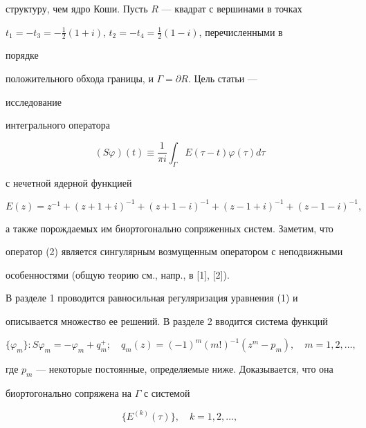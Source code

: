 структуру, чем ядро Коши. Пусть $R$ --- квадрат с вершинами в точках 


$t_1=-t_3=-\frac{1}{2}(1+i)$, $t_2=-t_4=\frac{1}{2}(1-i)$, перечисленными в 


порядке 


положительного обхода границы, и $\Gamma=\partial R$. Цель статьи --- 


исследование 


интегрального оператора 


\begin{equation} 


(S\varphi)(t)\equiv\frac{1}{\pi i}\int_\Gamma 


E(\tau-t)\varphi(\tau)d\tau 


\end{equation} 


с нечетной ядерной функцией 


\begin{equation} 


E(z)=z^{-1}+(z+1+i)^{-1}+(z+1-i)^{-1}+(z-1+i)^{-1}+ 


(z-1-i)^{-1}, 


\end{equation} 


а также порождаемых им биортогонально сопряженных систем. Заметим, что 


оператор (2) является сингулярным возмущенным оператором с неподвижными 


особенностями (общую теорию см., напр., в [1], [2]). 


 


В разделе 1 проводится равносильная регуляризация уравнения (1) и 


описывается множество ее решений. В разделе 2 вводится система функций 


\begin{equation} 


\{\varphi_m\}:S\varphi_m=-\varphi_m+q^+_m;\quad 


q_m(z)=(-1)^m(m!)^{-1}(z^m-p_m),\quad m=1,2,\dotsc, 


\end{equation} 


где $p_m$ --- некоторые постоянные, определяемые ниже. Доказывается, что она 


биортогонально сопряжена на $\Gamma$ с системой 


\begin{equation} 


\{E^{(k)}(\tau)\},\quad k=1,2,\dotsc, 


\end{equation} 


